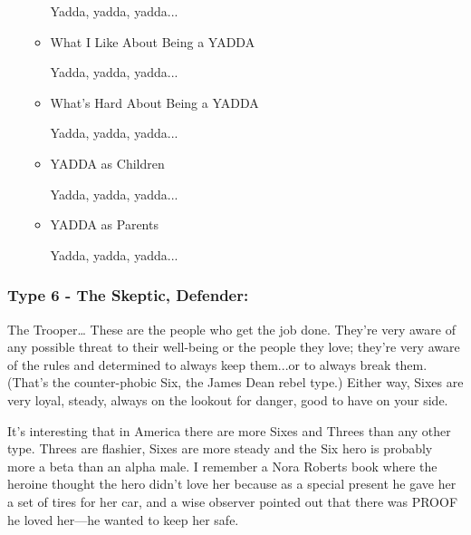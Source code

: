 \documentclass[openleft,oneside,showtrims]{memoir}
\begin{document}
\begin{itemize}
\begin{itemize}
Yadda, yadda, yadda...

\item What I Like About Being a YADDA
\label{sec:orga216e9c}

Yadda, yadda, yadda...

\item What's Hard About Being a YADDA
\label{sec:org549f8e6}

Yadda, yadda, yadda...

\item YADDA as Children
\label{sec:orgbbf6f4d}

Yadda, yadda, yadda...

\item YADDA as Parents
\label{sec:org23eaf71}

Yadda, yadda, yadda...
\end{itemize}
\end{itemize}

\subsubsection*{Type 6 - The Skeptic, Defender:}
\label{sec:org8e0cf3a}

The Trooper… These are the people who get the job done. They're very aware of any possible threat to their well-being or the people they love; they're very aware of the rules and determined to always keep them...or to always break them. (That's the counter-phobic Six, the James Dean rebel type.) Either way, Sixes are very loyal, steady, always on the lookout for danger, good to have on your side.

It's interesting that in America there are more Sixes and Threes than any other type. Threes are flashier, Sixes are more steady and the Six hero is probably more a beta than an alpha male. I remember a Nora Roberts book where the heroine thought the hero didn't love her because as a special present he gave her a set of tires for her car, and a wise observer pointed out that there was PROOF he loved her—he wanted to keep her safe.
\end{document}
